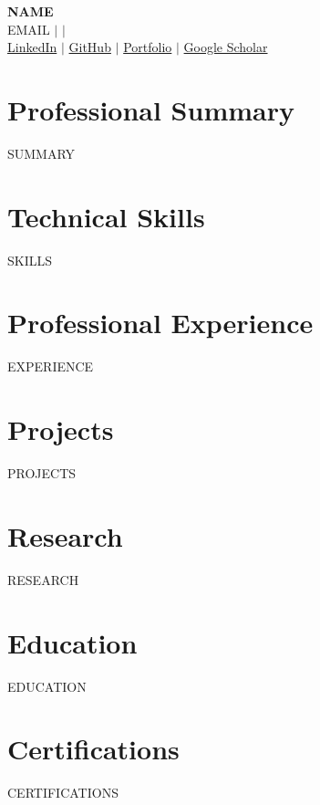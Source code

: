 \documentclass[11pt,a4paper]{article}
\begin{document}
\begin{center}
    {\LARGE\bfseries {{NAME}}} \\[4pt]
    {{EMAIL}} \quad $\vert$  \quad $\vert$  \\[2pt]
    \href{{{LINKEDIN}}}{LinkedIn} \quad $\vert$ \quad \href{{{GITHUB}}}{GitHub} \quad $\vert$ \quad \href{{{PORTFOLIO}}}{Portfolio} \quad $\vert$ \quad \href{{{GOOGLE_SCHOLAR}}}{Google Scholar}
\end{center}

\section{Professional Summary}
{{SUMMARY}}

\section{Technical Skills}
{{SKILLS}}

\section{Professional Experience}
{{EXPERIENCE}}

\section{Projects}
{{PROJECTS}}

\section{Research}
{{RESEARCH}}

\section{Education}
{{EDUCATION}}

\section{Certifications}
{{CERTIFICATIONS}}
\end{document}
